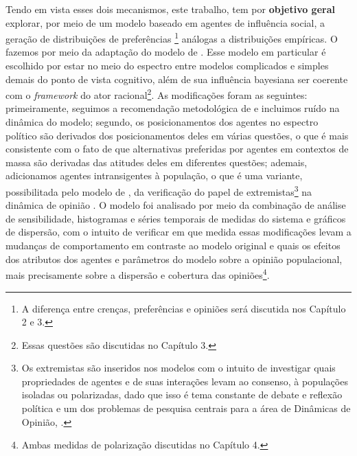 Tendo em vista esses dois mecanismos, este trabalho, tem por \textbf{objetivo
  geral} explorar, por meio de um modelo baseado em agentes de influência
social, a geração de distribuições de preferências \footnote{A diferença entre
  crenças, preferências e opiniões será discutida nos Capítulo 2 e 3.} análogas
a distribuições empíricas. O fazemos por meio da adaptação do modelo de
. Esse modelo em particular é escolhido por
estar no meio do espectro entre modelos complicados e simples demais do ponto de
vista cognitivo, além de sua influência bayesiana ser coerente com o
\textit{framework} do ator racional\footnote{Essas questões são discutidas no
  Capítulo 3.}. As modificações foram as seguintes: primeiramente, seguimos a
recomendação metodológica de  e incluimos ruído na
dinâmica do modelo; segundo, os posicionamentos dos agentes no espectro político
são derivados dos posicionamentos deles em várias questões, o que é mais
consistente com o fato de que alternativas preferidas por agentes em contextos
de massa são derivadas das atitudes deles em diferentes questões; ademais,
adicionamos agentes intransigentes à população, o que é uma variante,
possibilitada pelo modelo de , da verificação do
papel de extremistas\footnote{ Os extremistas são inseridos nos modelos com o
  intuito de investigar quais propriedades de agentes e de suas interações levam
  ao consenso, à populações isoladas ou polarizadas, dado que isso é tema
  constante de debate e reflexão política e um dos problemas de pesquisa
  centrais para a área de Dinâmicas de Opinião, \cite{fiorina2005culture,
    pulick2016, bramson2016disambiguation}.} na dinâmica de opinião
\cite{deffuant2002can, flache2017}. O modelo foi analisado por meio da
combinação de análise de sensibilidade, histogramas e séries temporais de
medidas do sistema e gráficos de dispersão, com o intuito de verificar em que
medida essas modificações levam a mudanças de comportamento em contraste ao
modelo original e quais os efeitos dos atributos dos agentes e parâmetros do
modelo sobre a opinião populacional, mais precisamente sobre a dispersão e
cobertura das opiniões\footnote{Ambas medidas de
  polarização discutidas no Capítulo 4.}.

